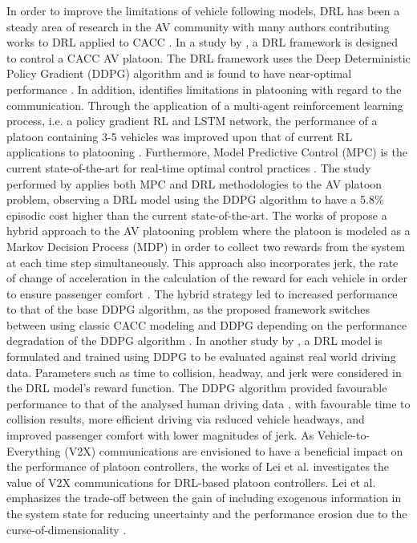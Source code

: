In order to improve the limitations of vehicle following models, DRL has been a 
steady area of research in the AV community with many authors contributing works 
to DRL applied to CACC \cite{Lin2019, Song2020, Chu2019b, Peake2020}.  In a study 
by \cite{Lin2019},  a DRL framework is designed to control a CACC AV platoon.  The 
DRL framework uses the Deep Deterministic Policy Gradient (DDPG) \cite{Lillicrap2016} 
algorithm and is found to have near-optimal performance \cite{Lin2019}.  In addition, 
\cite{Peake2020} identifies limitations in platooning with regard to the communication.  
Through the application of a multi-agent reinforcement learning process, i.e. a policy 
gradient RL and LSTM network, the performance of a platoon containing 3-5 vehicles was 
improved upon that of current RL applications to platooning \cite{Peake2020}. Furthermore, 
Model Predictive Control (MPC) is the current state-of-the-art for real-time optimal 
control practices \cite{Lin_2021}.  The study performed by \cite{Lin_2021} applies both 
MPC and DRL methodologies to the AV platoon problem, observing a DRL model using the 
DDPG algorithm to have a 5.8\% episodic cost higher than the current state-of-the-art. 
The works of \cite{yan2021hybrid} propose a hybrid approach to the AV platooning 
problem where the platoon is modeled as a Markov Decision Process (MDP) in order to 
collect two rewards from the system at each time step simultaneously.  This approach 
also incorporates jerk, the rate of change of acceleration in the calculation of the 
reward for each vehicle in order to ensure passenger comfort \cite{yan2021hybrid}.  The 
hybrid strategy led to increased performance to that of the base DDPG algorithm, as the 
proposed framework switches between using classic CACC modeling and DDPG depending on 
the performance degradation of the DDPG algorithm \cite{yan2021hybrid}. In another 
study by \cite{Zhu2019}, a DRL model is formulated and trained using DDPG to be evaluated 
against real world driving data. Parameters such as time to collision, headway, and jerk 
were considered in the DRL model's reward function.  The DDPG algorithm provided favourable 
performance to that of the analysed human driving data \cite{Zhu2019}, with favourable 
time to collision results, more efficient driving via reduced vehicle headways, and 
improved passenger comfort with lower magnitudes of jerk. As Vehicle-to-Everything (V2X) 
communications are envisioned to have a beneficial impact on the performance of platoon 
controllers, the works of Lei et al. investigates the value of V2X communications for 
DRL-based platoon controllers. Lei et al. emphasizes the trade-off between the gain of 
including exogenous information in the system state for reducing uncertainty and the 
performance erosion due to the curse-of-dimensionality \cite{LeiV2x}.

